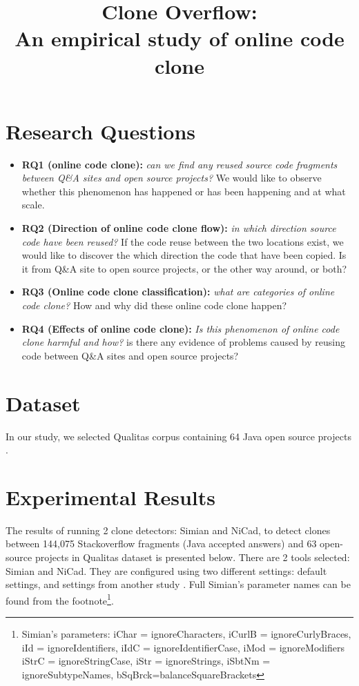 \documentclass{IEEEtran}
\begin{document}
\onecolumn

\title{Clone Overflow: \\
	An empirical study of online code clone}
\maketitle

\section*{Research Questions}
\begin{itemize}
	\item \textbf{RQ1 (online code clone):} \textit{can we find any reused source code fragments between Q\&A sites and open source projects?} We would like to observe whether this phenomenon has happened or has been happening and at what scale.
	\item \textbf{RQ2 (Direction of online code clone flow):} \textit{in which direction source code have been reused?} If the code reuse between the two locations exist, we would like to discover the which direction the code that have been copied. Is it from Q\&A site to open source projects, or the other way around, or both?
	\item \textbf{RQ3 (Online code clone classification):} \textit{what are categories of online code clone?} How and why did these online code clone happen?
	\item \textbf{RQ4 (Effects of online code clone):} \textit{ Is this phenomenon of online code clone harmful and how?} is there any evidence of problems caused by reusing code between Q\&A sites and open source projects?
\end{itemize}

\section*{Dataset}
In our study, we selected Qualitas corpus containing 64 Java open source projects \cite{Qualitas}.

\section*{Experimental Results}
The results of running 2 clone detectors: Simian and NiCad, to detect clones between 144,075 Stackoverflow fragments (Java accepted answers) and 63 open-source projects in Qualitas dataset is presented below. There are 2 tools selected: Simian and NiCad. They are configured using two different settings: default settings, and settings from another study \cite{Wang2013}. Full Simian's parameter names can be found from the footnote\footnote{Simian's parameters: iChar = ignoreCharacters, iCurlB = ignoreCurlyBraces, iId = ignoreIdentifiers, iIdC = ignoreIdentifierCase, iMod = ignoreModifiers \newline iStrC = ignoreStringCase, iStr = ignoreStrings, iSbtNm = ignoreSubtypeNames, bSqBrck=balanceSquareBrackets}. 
\end{document}
